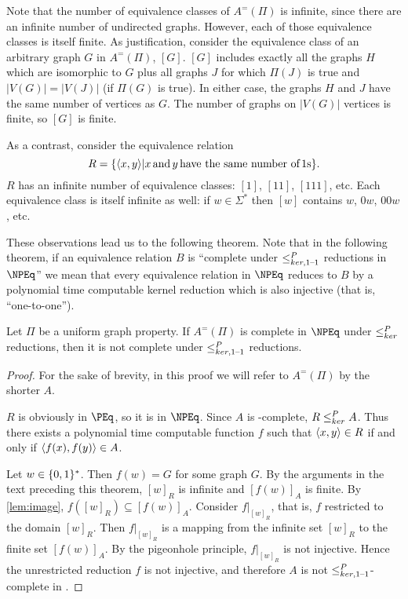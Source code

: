 Note that the number of equivalence classes of $A^=(\Pi)$ is infinite, since there are an infinite number of undirected graphs.
However, each of those equivalence classes is itself finite.
As justification, consider the equivalence class of an arbitrary graph $G$ in $A^=(\Pi)$, $[G]$.
$[G]$ includes exactly all the graphs $H$ which are isomorphic to $G$ plus all graphs $J$ for which $\Pi(J)$ is true and $|V(G)|=|V(J)|$ (if $\Pi(G)$ is true).
In either case, the graphs $H$ and $J$ have the same number of vertices as $G$.
The number of graphs on $|V(G)|$ vertices is finite, so $[G]$ is finite.

As a contrast, consider the equivalence relation
\begin{displaymath}
  R=\{\langle x,y\rangle|x\,\text{and}\,y\,\text{have the same number of}\,1\textnormal{s}\}.
\end{displaymath}
$R$ has an infinite number of equivalence classes: $[1]$, $[11]$, $[111]$, etc.
Each equivalence class is itself infinite as well: if $w\in\Sigma^*$ then $[w]$ contains $w$, $0w$, $00w$, etc.

These observations lead us to the following theorem.
Note that in the following theorem, if an equivalence relation $B$ is ``complete under $\leq^{P}_{ker,1\text{--}1}$ reductions in $\NPEq$'' we mean that every equivalence relation in $\NPEq$ reduces to $B$ by a polynomial time computable kernel reduction which is also injective (that is, ``one-to-one'').

\begin{theorem}
  Let $\Pi$ be a uniform graph property.
  If $A^=(\Pi)$ is complete in $\NPEq$ under $\leq^{P}_{ker}$ reductions, then it is not complete under $\leq^{P}_{ker,1\text{--}1}$ reductions.
\end{theorem}
\begin{proof}
  For the sake of brevity, in this proof we will refer to $A^=(\Pi)$ by the shorter $A$.

  $R$ is obviously in $\PEq$, so it is in $\NPEq$.
  Since $A$ is \NPEq-complete, $R\leq^{P}_{ker} A$.
  Thus there exists a polynomial time computable function $f$ such that $\langle x,y\rangle\in R$ if and only if $\langle f(x),f(y)\rangle\in A$.

  Let $w\in\{0, 1\}^{*}$.
  Then $f(w)=G$ for some graph $G$.
  By the arguments in the text preceding this theorem, $[w]_R$ is infinite and $[f(w)]_A$ is finite.
  By \autoref{lem:image}, $f([w]_R)\subseteq [f(w)]_A$.
  Consider $f|_{[w]_R}$, that is, $f$ restricted to the domain $[w]_R$.
  Then $f|_{[w]_R}$ is a mapping from the infinite set $[w]_R$ to the finite set $[f(w)]_A$.
  By the pigeonhole principle, $f|_{[w]_R}$ is not injective.
  Hence the unrestricted reduction $f$ is not injective, and therefore $A$ is not $\leq^{P}_{ker,1\text{--}1}$-complete in \NPEq.
\end{proof}

